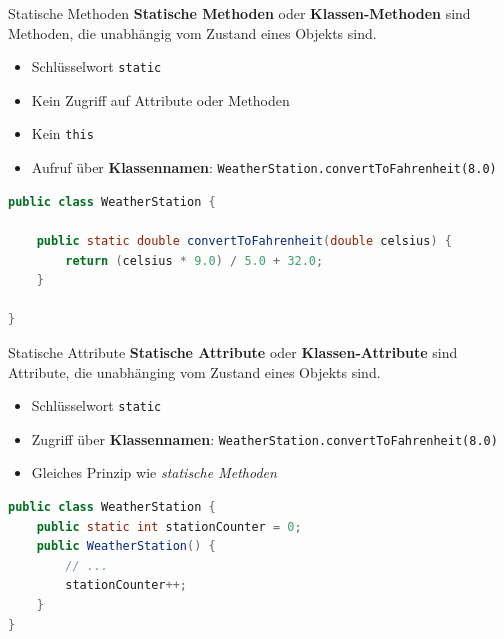 \documentclass[18pt]{beamer}
\begin{document}
\begin{frame}[fragile]{Statische Methoden}
    \textbf{Statische Methoden} oder \textbf{Klassen-Methoden} sind Methoden, die unabhängig vom Zustand eines Objekts sind.
    \begin{itemize}
        \item Schlüsselwort \texttt{static}
        \item Kein Zugriff auf Attribute oder Methoden
        \item Kein \texttt{this}
        \item Aufruf über \textbf{Klassennamen}: \texttt{WeatherStation.convertToFahrenheit(8.0)}
    \end{itemize}

    \begin{exampleblock}{}
        \begin{lstlisting}[language=Java,basicstyle=\scriptsize]
public class WeatherStation {

    public static double convertToFahrenheit(double celsius) {
        return (celsius * 9.0) / 5.0 + 32.0;
    }

}
        \end{lstlisting}
    \end{exampleblock}

\end{frame}

\begin{frame}[fragile]{Statische Attribute}
    \textbf{Statische Attribute} oder \textbf{Klassen-Attribute} sind Attribute, die unabhänging vom Zustand eines Objekts sind.
    \begin{itemize}
        \item Schlüsselwort \texttt{static}
        \item Zugriff über \textbf{Klassennamen}: \texttt{WeatherStation.convertToFahrenheit(8.0)}
        \item Gleiches Prinzip wie \textit{statische Methoden}
    \end{itemize}

    \begin{exampleblock}{}
        \begin{lstlisting}[language=Java,basicstyle=\scriptsize]
public class WeatherStation {
    public static int stationCounter = 0;
    public WeatherStation() {
        // ...
        stationCounter++;
    }
}
        \end{lstlisting}
    \end{exampleblock}
\end{frame}
\end{document}
